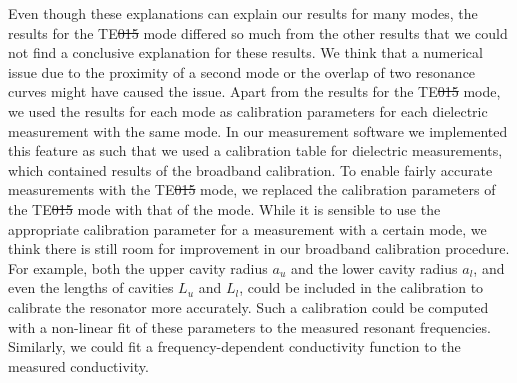 Even though these explanations can explain our results for many modes, the results for the TE\st{015} mode differed so much from the other results that we could not find a conclusive explanation for these results. We think that a numerical issue due to the proximity of a second mode or the overlap of two resonance curves might have caused the issue. Apart from the results for the TE\st{015} mode, we used the results for each mode as calibration parameters for each dielectric measurement with the same mode. In our measurement software we implemented this feature as such that we used a calibration table for dielectric measurements, which contained results of the broadband calibration. To enable fairly accurate measurements with the TE\st{015} mode, we replaced the calibration parameters of the TE\st{015} mode with that of the \te{} mode. While it is sensible to use the appropriate calibration parameter for a measurement with a certain mode, we think there is still room for improvement in our broadband calibration procedure. For example, both the upper cavity radius $a_u$ and the lower cavity radius $a_l$, and even the lengths of cavities $L_u$ and $L_l$, could be included in the calibration to calibrate the resonator more accurately. Such a calibration could be computed with a non-linear fit of these parameters to the measured resonant frequencies. Similarly, we could fit a frequency-dependent conductivity function to the measured conductivity. 

